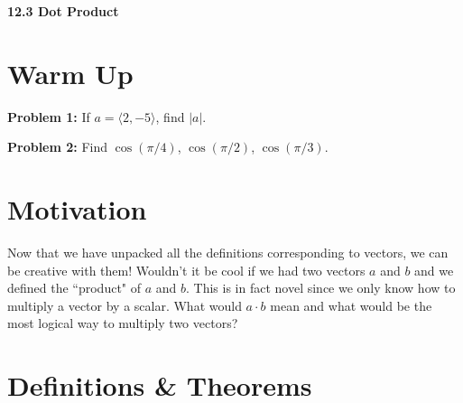 \documentclass[11pt]{article}
\newcommand{\vs}{\vspace*{.1in}}
\begin{document}
\begin{LARGE}\begin{center}\bf 12.3 Dot Product \end{center}
\end{LARGE}

\vs\vs



\section{Warm Up}

\textbf{Problem 1:} If $a= \langle 2, -5 \rangle$, find $|a|$.

\textbf{Problem 2:} Find $\cos(\pi/4)$, $\cos(\pi/2)$, $\cos(\pi/3)$.



\section{Motivation}

Now that we have unpacked all the definitions corresponding to vectors, we can be creative with them! Wouldn't it be cool if we had two vectors $a$ and $b$ and we defined the ``product" of $a$ and $b$. This is in fact novel since we only know how to multiply a vector by a scalar. What would $a \cdot b$ mean and what would be the most logical way to multiply two vectors?




\section{Definitions \& Theorems}
\end{document}
